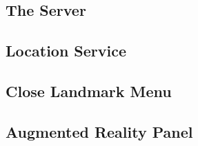 \subsection{The Server}
\subsection{Location Service}
\subsection{Close Landmark Menu}
\subsection{Augmented Reality Panel}